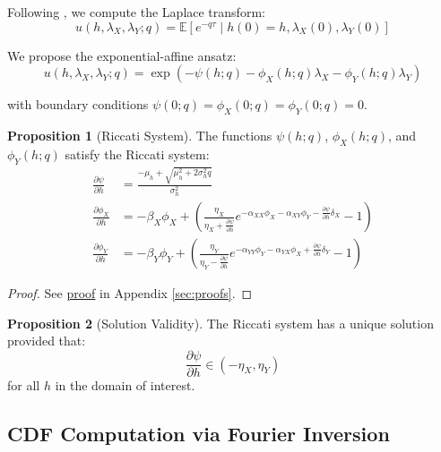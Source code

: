 \documentclass{article}
\newcommand{\E}{\mathbb{E}}
\newcommand{\pard}[2]{\frac{\partial #1}{\partial #2}}
\theoremstyle{definition}
\newtheorem{proposition}{Proposition}[section]
\newcommand{\proofref}[1]{\hyperlink{#1}{proof}}
\begin{document}
Following \citet{DuffiePanSingleton2000}, we compute the Laplace transform:
\begin{equation}
u(h, \lambda_X, \lambda_Y; q) = \E[e^{-q\tau} \mid h(0) = h, \lambda_X(0), \lambda_Y(0)]
\end{equation}

We propose the exponential-affine ansatz:
\begin{equation}
u(h, \lambda_X, \lambda_Y; q) = \exp(-\psi(h;q) - \phi_X(h;q)\lambda_X - \phi_Y(h;q)\lambda_Y) \label{eq:ansatz}
\end{equation}

with boundary conditions $\psi(0;q) = \phi_X(0;q) = \phi_Y(0;q) = 0$.

\begin{proposition}[Riccati System]
\label{prop:riccati}
The functions $\psi(h;q)$, $\phi_X(h;q)$, and $\phi_Y(h;q)$ satisfy the Riccati system:
\begin{align}
\pard{\psi}{h} &= \frac{-\mu_h + \sqrt{\mu_h^2 + 2\sigma_h^2 q}}{\sigma_h^2} \label{eq:riccati_psi}\\
\pard{\phi_X}{h} &= -\beta_X \phi_X + \left(\frac{\eta_X}{\eta_X + \pard{\psi}{h}} e^{-\alpha_{XX}\phi_X - \alpha_{XY}\phi_Y - \pard{\psi}{h}\delta_X} - 1\right) \label{eq:riccati_phi_X}\\
\pard{\phi_Y}{h} &= -\beta_Y \phi_Y + \left(\frac{\eta_Y}{\eta_Y - \pard{\psi}{h}} e^{-\alpha_{YY}\phi_Y - \alpha_{YX}\phi_X + \pard{\psi}{h}\delta_Y} - 1\right) \label{eq:riccati_phi_Y}
\end{align}
\end{proposition}

\begin{proof}
See \proofref{prop:riccati} in Appendix \ref{sec:proofs}.
\end{proof}

\begin{proposition}[Solution Validity]
\label{prop:validity}
The Riccati system has a unique solution provided that:
\begin{equation}
\pard{\psi}{h} \in (-\eta_X, \eta_Y) \label{eq:validity_condition}
\end{equation}
for all $h$ in the domain of interest.
\end{proposition}

\subsection{CDF Computation via Fourier Inversion}
\end{document}
